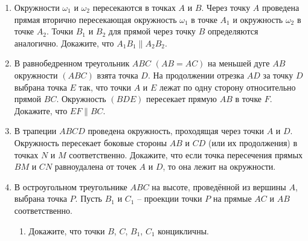 \begin{enumerate}
    \item {}\label{lem:fuss}{Окружности $\omega_1$ и $\omega_2$ пересекаются в точках $A$ и $B$. Через точку $A$ проведена прямая вторично пересекающая окружность $\omega_1$ в точке $A_1$ и окружность $\omega_2$ в точке $A_2$. Точки $B_1$ и $B_2$ для прямой через точку $B$ определяются аналогично. Докажите, что $A_1B_1 \parallel A_2B_2$.} \wishlisted  
    

    \item В равнобедренном треугольник $ABC$ $(AB=AC)$ на меньшей дуге $AB$ окружности $(ABC)$ взята точка $D$. На продолжении отрезка $AD$ за точку $D$ выбрана точка $E$ так, что точки $A$ и $E$ лежат по одну сторону относительно прямой $BC$. Окружность $(BDE)$ пересекает прямую $AB$ в точке $F$. Докажите, что $EF \parallel BC$.

    

    \item В трапеции $ABCD$ проведена окружность, проходящая через точки $A$ и $D$. Окружность пересекает боковые стороны $AB$ и $CD$ (или их продолжения) в точках $N$ и $M$ соответственно. Докажите, что если точка пересечения прямых $BM$ и $CN$ равноудалена от точек $A$ и $D$, то она лежит на окружности. \wishlisted

    
    \item В остроугольном треугольнике $ABC$ на высоте, проведённой из вершины $A$, выбрана точка $P$. Пусть $B_1$ и $C_1$ -- проекции точки $P$ на прямые $AC$ и $AB$ соответственно. 
    \begin{enumerate}
        \item Докажите, что точки $B$, $C$, $B_1$, $C_1$ концикличны. \wishlisted\label{lem:projections}
        

\end{enumerate}
\end{enumerate}
